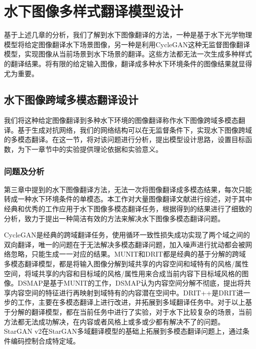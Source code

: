 \chapter{水下图像多样式翻译模型设计}
基于上述几章的分析，我们了解到水下图像翻译的方法，一种是基于水下光学物理模型将给定图像翻译水下场景图像，另一种是利用CycleGAN这种无监督图像翻译模型，实现图像从当前场景到水下场景的翻译。这些方法都无法一次生成多种样式的翻译结果。将有限的给定输入图像，翻译成多种水下环境条件的图像结果就显得尤为重要。%

\section{水下图像跨域多模态翻译设计}
我们将这种给定图像翻译到多种水下环境的图像翻译称作水下图像跨域多模态翻译。基于生成对抗网络，我们的网络结构可以在无监督条件下，实现水下图像跨域的多模态翻译。在这一节，将对该问题进行分析，提出模型设计思路，设置目标函数，为下一章节中的实验提供理论依据和实验意义。

\subsection{问题及分析}
第三章中提到的水下图像翻译方法，无法一次将图像翻译成多模态结果，每次只能转成一种水下环境条件的单模态。本工作对大量图像翻译文献进行综述，对于其中经典和优秀的工作应用于水下图像多模态翻译任务，根据得到的结果进行了细致的分析，致力于提出一种简洁有效的方法来解决水下图像多模态翻译问题。

CycleGAN是经典的跨域翻译任务，使用循环一致性损失成功实现了两个域之间的双向翻译，唯一的问题在于无法解决多模态翻译问题，加入噪声进行扰动都会被网络忽略，只能生成一一对应的结果。MUNIT和DRIT都是经典的基于分解的跨域多模态翻译模型，都是将输入图像分解到域共享的内容空间和域特有的风格/属性空间，将域共享的内容和目标域的风格/属性用来合成当前内容下目标域风格的图像。DSMAP是基于MUNIT的工作，DSMAP认为内容空间分解不彻底，提出将共享内容空间的特征进行再映射到域特有的内容潜在空间中。DRIT++是DRIT进一步的工作，主要在多模态翻译上进行改进，并拓展到多域翻译任务中。对于以上基于分解的翻译模型，都在当前任务中进行了实验，对于水下比较复杂的场景，当前方法都无法成功解决，在内容或者风格上或多或少都有解决不了的问题。StarGAN v2在StarGAN多域翻译模型的基础上拓展到多模态翻译问题上，通过条件编码控制合成特定域。

